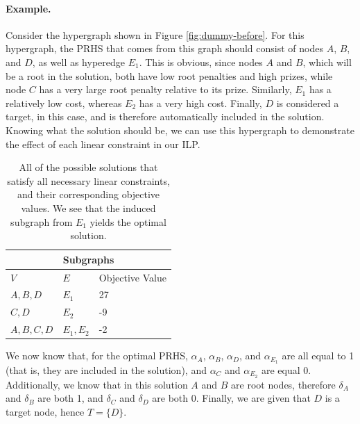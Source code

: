 \documentclass[12pt,twoside]{reedthesis}
\theoremstyle{definition}
\begin{document}
\paragraph{Example.}Consider the hypergraph shown in Figure \ref{fig:dummy-before}. For this hypergraph, the PRHS that comes from this graph should consist of nodes $A$, $B$, and $D$, as well as hyperedge $E_1$. This is obvious, since nodes $A$ and $B$, which will be a root in the solution, both have low root penalties and high prizes, while node $C$ has a very large root penalty relative to its prize. Similarly, $E_1$ has a relatively low cost, whereas $E_2$ has a very high cost. Finally, $D$ is considered a target, in this case, and is therefore automatically included in the solution. Knowing what the solution should be, we can use this hypergraph to demonstrate the effect of each linear constraint in our ILP.\par

\begin{table}[!h]
\begin{center}
  \label{tab:obj_values_dummy}
  \caption[Objective values of dummy hypergraph.]{All of the possible solutions that satisfy all necessary linear constraints, and their corresponding objective values. We see that the induced subgraph from $E_1$ yields the optimal solution.}
\begin{tabular}{ |l|l|l| }%
  \hline%
  \multicolumn{3}{|c|}{Subgraphs} \\%
  \hline \hline
  $V$ & $E$ & Objective Value \\ \hline%
  $A,B,D$ & $E_1$ & 27 \\ \hline%
  $C,D$ & $E_2$ & -9 \\ \hline%
  $A,B,C,D$ & $E_1,E_2$ & -2 \\ \hline%
\end{tabular}%
\end{center}
\end{table}

We now know that, for the optimal PRHS, $\alpha_A$, $\alpha_B$, $\alpha_D$, and $\alpha_{E_1}$ are all equal to 1 (that is, they are included in the solution), and $\alpha_C$ and $\alpha_{E_2}$ are equal 0. Additionally, we know that in this solution $A$ and $B$ are root nodes, therefore $\delta_A$ and $\delta_B$ are both 1, and $\delta_C$ and $\delta_D$ are both 0. Finally, we are given that $D$ is a target node, hence $T=\{D\}$.\par
\end{document}
